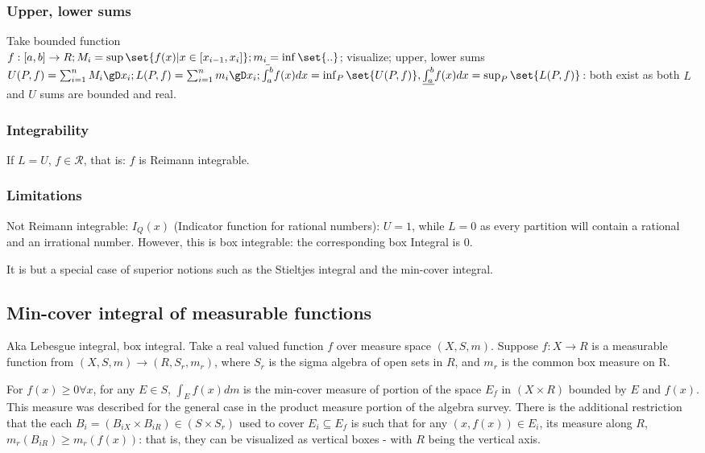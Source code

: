 \documentclass[oneside, article]{memoir}
\begin{document}
\subsubsection{Upper, lower sums}
Take bounded function \\
$f: [a,b] \to R; M_{i} = \sup \set{f(x)|x \in [x_{i-1}, x_{i}]}; m_{i} = \inf\set{..}$; visualize; upper, lower sums $U(P, f) = \sum_{i=1}^{n}M_{i}\gD x_{i}; L(P, f) = \sum_{i=1}^{n}m_{i}\gD x_{i}; \\
\bar{\int_{a}^{b}}f(x) dx = \inf_{P} \set{U(P, f)}, \underline{\int_{a}^{b}}f(x) dx = \sup_{P} \set{L(P, f)}$: both exist as both $L$ and $U$ sums are bounded and real.

\subsubsection{Integrability}
If $L=U$, $f \in \mathcal{R}$, that is: $f$ is Reimann integrable.

\subsubsection{Limitations}
Not Reimann integrable: $I_Q(x)$ (Indicator function for rational numbers): $U=1$, while $L=0$ as every partition will contain a rational and an irrational number. However, this is box integrable: the corresponding box Integral is 0.

It is but a special case of superior notions such as the Stieltjes integral and the min-cover integral.

\subsection{Min-cover integral of measurable functions}
Aka Lebesgue integral, box integral. Take a real valued function $f$ over measure space $(X, S, m)$. Suppose $f:X \to R$ is a measurable function from $(X, S, m) \to (R, S_r, m_r)$, where $S_r$ is the sigma algebra of open sets in $R$, and $m_r$ is the common box measure on R.

For $f(x) \geq 0 \forall x$,  for any $E \in S$, $\int_E f(x) dm$ is the min-cover measure of portion of the space $E_f$ in $(X \times R)$ bounded by $E$ and $f(x)$. This measure was described for the general case in the product measure portion of the algebra survey. There is the additional restriction that the each $B_i = (B_{iX} \times B_{iR}) \in (S \times S_r)$ used to cover $E_i \subseteq E_f $ is such that for any $(x, f(x)) \in E_i $, its measure along $R$, $m_r(B_{iR}) \geq m_r(f(x))$: that is, they can be visualized as vertical boxes - with $R$ being the vertical axis.
\end{document}
